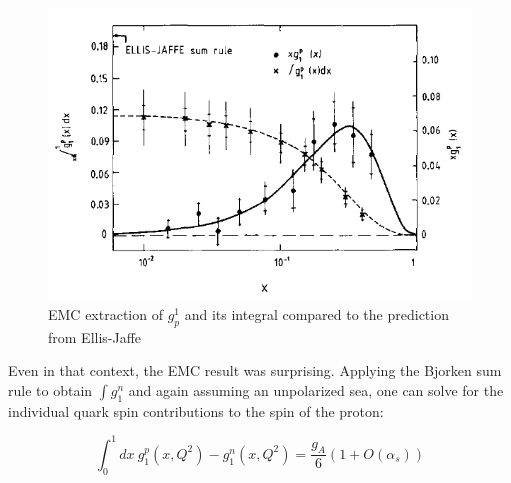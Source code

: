 \begin{figure}
  \includegraphics[width=1.0\textwidth]{figures/emc-g1p}
  \caption{EMC extraction of $g^1_p$ and its integral compared to the prediction from Ellis-Jaffe \cite{Ashman:1987hv}}
  \label{fig:emc-g1p}
\end{figure}

  Even in that context, the EMC result was surprising.  Applying the Bjorken sum rule to obtain $\int g_1^n$ and again assuming an unpolarized sea, one can solve for the individual quark spin contributions to the spin of the proton:

\begin{equation}
  \int_0^1 dx~g_1^p(x,Q^2) - g_1^n(x,Q^2) = \frac{g_A}{6}(1 + O(\alpha_s))
\end{equation}

% 
% 
% 
% 
% 
% 
% 
% 
